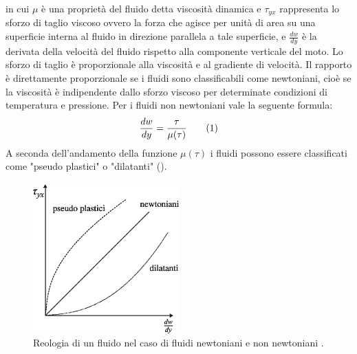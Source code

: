 in cui \(\mu\) è una proprietà del fluido detta viscosità dinamica e \(\tau_{yx}\) rappresenta lo sforzo di taglio viscoso ovvero la forza che agisce per unità di area su  una superficie interna al fluido in direzione parallela a tale superficie, e \(\frac{dw}{dy}\) è la derivata della velocità del fluido rispetto alla componente verticale del moto. Lo sforzo di taglio è proporzionale alla viscosità e al gradiente di velocità. Il rapporto è direttamente proporzionale se i fluidi sono classificabili come newtoniani, cioè se la viscosità è indipendente dallo sforzo viscoso per determinate condizioni di temperatura e pressione. Per i fluidi non newtoniani vale la seguente formula:
\[\frac{dw}{dy}=\frac{\tau}{\mu(\tau)}\addtag\label{eq:newtoniani}\]
A seconda dell'andamento della funzione \(\mu(\tau)\) i fluidi possono essere classificati come "pseudo plastici" o "dilatanti" ().
\begin{figure}[htbp] %
    \centering
    \includegraphics[width=0.5\textwidth]{fig/fluidodinamica/newtoniani.eps}
    \caption{Reologia di un fluido nel caso di fluidi newtoniani e non newtoniani \parencite{guglielmini2004lezioni}.} 
    \label{fig:newtoniani}
\end{figure}
